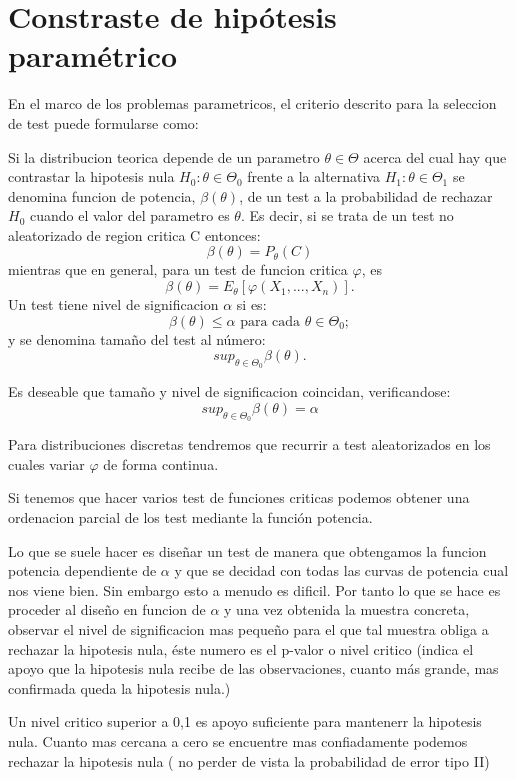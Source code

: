 \documentclass[a4paper,12pt]{article}
\begin{document}
\section{Constraste de hipótesis paramétrico}

En el marco de los problemas parametricos, el criterio descrito para la seleccion de test puede formularse como:


Si la distribucion teorica depende de un parametro $\theta \in \Theta$ acerca del cual hay que contrastar la hipotesis nula $H_0: \theta \in \Theta_0$ frente a la alternativa $H_1: \theta \in \Theta_1$ se denomina funcion de potencia, $\beta(\theta)$, de un test a la probabilidad de rechazar $H_0$ cuando el valor del parametro es $\theta$. Es decir, si se trata de un test no aleatorizado de region critica C entonces: $$\beta(\theta)=P_\theta(C)$$
mientras que en general, para un test de funcion critica $\varphi$, es $$\beta(\theta)=E_\theta[\varphi(X_1,...,X_n)].$$
Un test tiene nivel de significacion $\alpha$ si es:  $$\beta(\theta)\leq\alpha \text{ para cada } \theta \in \Theta_0;$$
y se denomina tamaño del test al número: $$sup_{\theta\in\Theta_0}\beta(\theta).$$

Es deseable que tamaño y nivel de significacion coincidan, verificandose: 
$$sup_{\theta\in\Theta_0}\beta(\theta)=\alpha$$

Para distribuciones discretas tendremos que recurrir a test aleatorizados en los cuales variar $\varphi$ de forma continua.

Si tenemos que hacer varios test de funciones criticas podemos obtener una ordenacion parcial de los test mediante la función potencia.

Lo que se suele hacer es diseñar un test de manera que obtengamos la funcion potencia dependiente de $\alpha$ y que se decidad con todas las curvas de potencia cual nos viene bien. Sin embargo esto a menudo es dificil. Por tanto lo que se hace es proceder al diseño en funcion de $\alpha$ y una vez obtenida la muestra concreta, observar el nivel de significacion mas pequeño para el que tal muestra obliga a rechazar la hipotesis nula, éste numero es el p-valor o nivel critico (indica el apoyo que la hipotesis nula recibe de las observaciones, cuanto más grande, mas confirmada queda la hipotesis nula.)


Un nivel critico superior a 0,1 es apoyo suficiente para mantenerr la hipotesis nula. Cuanto mas cercana a cero se encuentre mas confiadamente podemos rechazar la hipotesis nula ( no perder de vista la probabilidad de error tipo II)
\end{document}
